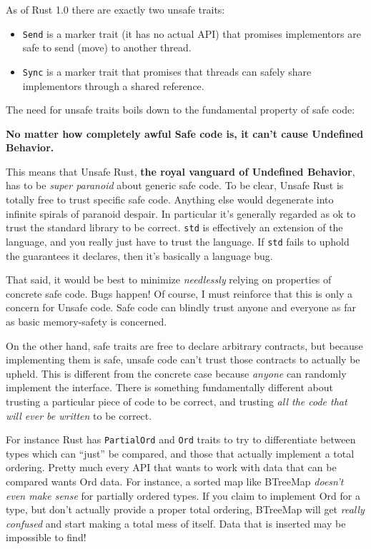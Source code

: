 \documentclass[a4paper,]{book}
\providecommand{\tightlist}{%
  \setlength{\itemsep}{0pt}\setlength{\parskip}{0pt}}
\begin{document}
As of Rust 1.0 there are exactly two unsafe traits:

\begin{itemize}
\tightlist
\item
  \texttt{Send} is a marker trait (it has no actual API) that promises
  implementors are safe to send (move) to another thread.
\item
  \texttt{Sync} is a marker trait that promises that threads can safely
  share implementors through a shared reference.
\end{itemize}

The need for unsafe traits boils down to the fundamental property of
safe code:

\textbf{No matter how completely awful Safe code is, it can't cause
Undefined Behavior.}

This means that Unsafe Rust, \textbf{the royal vanguard of Undefined
Behavior}, has to be \emph{super paranoid} about generic safe code. To
be clear, Unsafe Rust is totally free to trust specific safe code.
Anything else would degenerate into infinite spirals of paranoid
despair. In particular it's generally regarded as ok to trust the
standard library to be correct. \texttt{std} is effectively an extension
of the language, and you really just have to trust the language. If
\texttt{std} fails to uphold the guarantees it declares, then it's
basically a language bug.

That said, it would be best to minimize \emph{needlessly} relying on
properties of concrete safe code. Bugs happen! Of course, I must
reinforce that this is only a concern for Unsafe code. Safe code can
blindly trust anyone and everyone as far as basic memory-safety is
concerned.

On the other hand, safe traits are free to declare arbitrary contracts,
but because implementing them is safe, unsafe code can't trust those
contracts to actually be upheld. This is different from the concrete
case because \emph{anyone} can randomly implement the interface. There
is something fundamentally different about trusting a particular piece
of code to be correct, and trusting \emph{all the code that will ever be
written} to be correct.

For instance Rust has \texttt{PartialOrd} and \texttt{Ord} traits to try
to differentiate between types which can ``just'' be compared, and those
that actually implement a total ordering. Pretty much every API that
wants to work with data that can be compared wants Ord data. For
instance, a sorted map like BTreeMap \emph{doesn't even make sense} for
partially ordered types. If you claim to implement Ord for a type, but
don't actually provide a proper total ordering, BTreeMap will get
\emph{really confused} and start making a total mess of itself. Data
that is inserted may be impossible to find!
\end{document}
